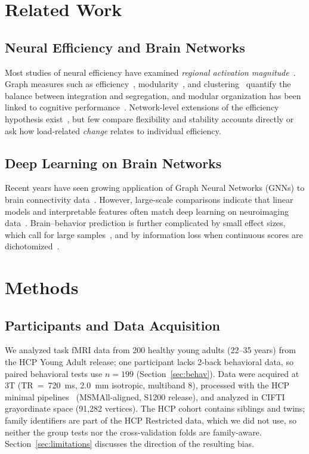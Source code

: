 \documentclass[conference]{IEEEtran}
\begin{document}
\section{Related Work}

\subsection{Neural Efficiency and Brain Networks}
Most studies of neural efficiency have examined \emph{regional activation magnitude}~\cite{haier1988cortical,neubauer2009intelligence}. Graph measures such as efficiency~\cite{latora2001efficient}, modularity~\cite{newman2006modularity}, and clustering~\cite{rubinov2010complex} quantify the balance between integration and segregation, and modular organization has been linked to cognitive performance~\cite{sporns2016modular,bullmore2012economy}. Network-level extensions of the efficiency hypothesis exist~\cite{schultz2016higher,shine2016dynamics}, but few compare flexibility and stability accounts directly or ask how load-related \emph{change} relates to individual efficiency.

\subsection{Deep Learning on Brain Networks}
Recent years have seen growing application of Graph Neural Networks (GNNs) to brain connectivity data~\cite{velickovic2017graph}. However, large-scale comparisons indicate that linear models and interpretable features often match deep learning on neuroimaging data~\cite{schulz2020different,he2020deep}. Brain--behavior prediction is further complicated by small effect sizes, which call for large samples~\cite{marek2022reproducible}, and by information loss when continuous scores are dichotomized~\cite{maccallum2002practice}.

\section{Methods}

\subsection{Participants and Data Acquisition}
We analyzed task fMRI data from 200 healthy young adults (22--35 years) from the HCP Young Adult release; one participant lacks 2-back behavioral data, so paired behavioral tests use $n=199$ (Section~\ref{sec:behav}). Data were acquired at 3T (TR~=~720~ms, 2.0~mm isotropic, multiband 8), processed with the HCP minimal pipelines~\cite{glasser2013minimal} (MSMAll-aligned, S1200 release), and analyzed in CIFTI grayordinate space (91,282 vertices). The HCP cohort contains siblings and twins; family identifiers are part of the HCP Restricted data, which we did not use, so neither the group tests nor the cross-validation folds are family-aware. Section~\ref{sec:limitations} discusses the direction of the resulting bias.
\end{document}
